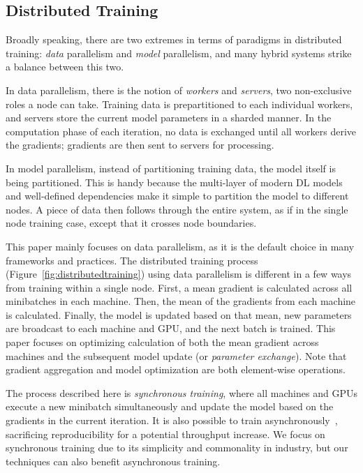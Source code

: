 \subsection{Distributed Training}
Broadly speaking, there are two extremes in terms of paradigms in distributed training: \textit{data} parallelism and \textit{model} parallelism, and many hybrid systems strike a balance between this two.

In data parallelism, there is the notion of \textit{workers} and \textit{servers}, two non-exclusive roles a node can take. Training data is prepartitioned to each individual workers, and servers store the current model parameters in a sharded manner. In the computation phase of each iteration, no data is exchanged until all workers derive the gradients; gradients are then sent to servers for processing.

In model parallelism, instead of partitioning training data, the model itself is being partitioned. This is handy because the multi-layer of modern DL models and well-defined dependencies make it simple to partition the model to different nodes. A piece of data then follows through the entire system, as if in the single node training case, except that it crosses node boundaries.

This paper mainly focuses on data parallelism, as it is the default choice in many frameworks and practices. The distributed training process (Figure~\ref{fig:distributedtraining}) using data parallelism is different in a few ways from training within a single node.
First, a mean gradient is calculated across all minibatches in each machine. Then, the mean of the gradients from each machine is calculated. Finally, the model is updated based on that mean, new parameters are broadcast to each machine and GPU, and the next batch is trained. This paper focuses on optimizing calculation of both the mean gradient across machines and the subsequent model update (or \textit{parameter exchange}). Note that gradient aggregation and model optimization are both element-wise operations.


The process described here is \textit{synchronous training}, where all machines and GPUs execute a new minibatch simultaneously and update the model based on the gradients in the current iteration. It is also possible to train asynchronously~\cite{tensorflow,revisitSGD,GeePS,recht2011hogwild,projectAdam,googleDNN}, sacrificing reproducibility for a potential throughput increase. %
We focus on synchronous training due to its simplicity and commonality in industry, but our techniques can also benefit asynchronous training.

